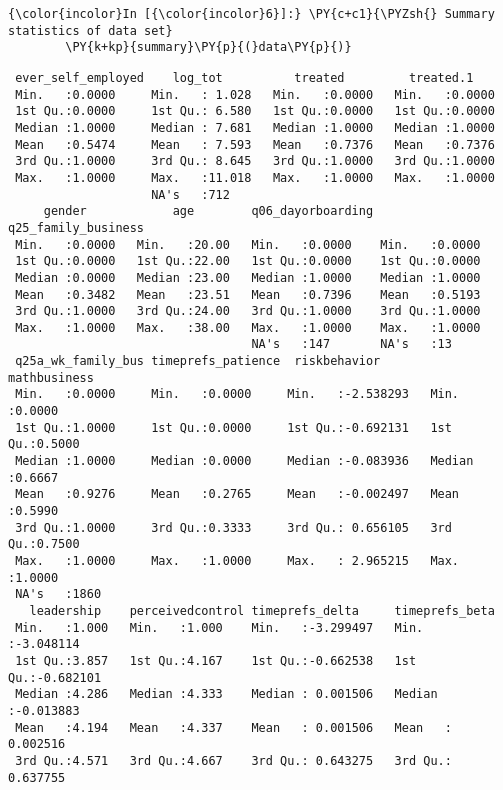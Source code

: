    \begin{Verbatim}[commandchars=\\\{\}]
{\color{incolor}In [{\color{incolor}6}]:} \PY{c+c1}{\PYZsh{} Summary statistics of data set}
        \PY{k+kp}{summary}\PY{p}{(}data\PY{p}{)}
\end{Verbatim}


    
    \begin{verbatim}
 ever_self_employed    log_tot          treated         treated.1     
 Min.   :0.0000     Min.   : 1.028   Min.   :0.0000   Min.   :0.0000  
 1st Qu.:0.0000     1st Qu.: 6.580   1st Qu.:0.0000   1st Qu.:0.0000  
 Median :1.0000     Median : 7.681   Median :1.0000   Median :1.0000  
 Mean   :0.5474     Mean   : 7.593   Mean   :0.7376   Mean   :0.7376  
 3rd Qu.:1.0000     3rd Qu.: 8.645   3rd Qu.:1.0000   3rd Qu.:1.0000  
 Max.   :1.0000     Max.   :11.018   Max.   :1.0000   Max.   :1.0000  
                    NA's   :712                                       
     gender            age        q06_dayorboarding q25_family_business
 Min.   :0.0000   Min.   :20.00   Min.   :0.0000    Min.   :0.0000     
 1st Qu.:0.0000   1st Qu.:22.00   1st Qu.:0.0000    1st Qu.:0.0000     
 Median :0.0000   Median :23.00   Median :1.0000    Median :1.0000     
 Mean   :0.3482   Mean   :23.51   Mean   :0.7396    Mean   :0.5193     
 3rd Qu.:1.0000   3rd Qu.:24.00   3rd Qu.:1.0000    3rd Qu.:1.0000     
 Max.   :1.0000   Max.   :38.00   Max.   :1.0000    Max.   :1.0000     
                                  NA's   :147       NA's   :13         
 q25a_wk_family_bus timeprefs_patience  riskbehavior        mathbusiness   
 Min.   :0.0000     Min.   :0.0000     Min.   :-2.538293   Min.   :0.0000  
 1st Qu.:1.0000     1st Qu.:0.0000     1st Qu.:-0.692131   1st Qu.:0.5000  
 Median :1.0000     Median :0.0000     Median :-0.083936   Median :0.6667  
 Mean   :0.9276     Mean   :0.2765     Mean   :-0.002497   Mean   :0.5990  
 3rd Qu.:1.0000     3rd Qu.:0.3333     3rd Qu.: 0.656105   3rd Qu.:0.7500  
 Max.   :1.0000     Max.   :1.0000     Max.   : 2.965215   Max.   :1.0000  
 NA's   :1860                                                              
   leadership    perceivedcontrol timeprefs_delta     timeprefs_beta     
 Min.   :1.000   Min.   :1.000    Min.   :-3.299497   Min.   :-3.048114  
 1st Qu.:3.857   1st Qu.:4.167    1st Qu.:-0.662538   1st Qu.:-0.682101  
 Median :4.286   Median :4.333    Median : 0.001506   Median :-0.013883  
 Mean   :4.194   Mean   :4.337    Mean   : 0.001506   Mean   : 0.002516  
 3rd Qu.:4.571   3rd Qu.:4.667    3rd Qu.: 0.643275   3rd Qu.: 0.637755  

\end{verbatim}
